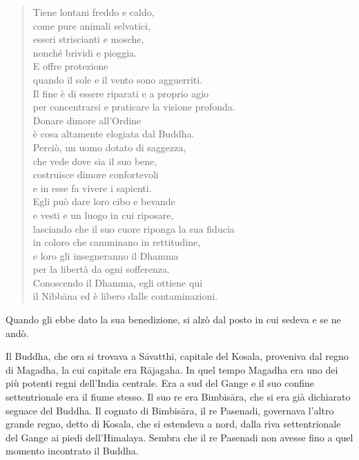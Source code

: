\begin{quote}
Tiene lontani freddo e caldo, \\
come pure animali selvatici, \\
esseri striscianti e mosche, \\
nonché brividi e pioggia. \\
E offre protezione \\
quando il sole e il vento sono agguerriti. \\
Il fine è di essere riparati e a proprio agio \\
per concentrarsi e praticare la visione profonda. \\
Donare dimore all’Ordine \\
è cosa altamente elogiata dal Buddha. \\
Perciò, un uomo dotato di saggezza, \\
che vede dove sia il suo bene, \\
costruisce dimore confortevoli \\
e in esse fa vivere i sapienti. \\
Egli può dare loro cibo e bevande \\
e vesti e un luogo in cui riposare, \\
lasciando che il suo cuore riponga la sua fiducia \\
in coloro che camminano in rettitudine, \\
e loro gli insegneranno il Dhamma \\
per la libertà da ogni sofferenza. \\
Conoscendo il Dhamma, egli ottiene qui \\
il Nibbāna ed è libero dalle contaminazioni.
\end{quote}

Quando gli ebbe dato la sua benedizione, si alzò dal posto in cui sedeva
e se ne andò.




 Il Buddha, che ora si trovava a Sāvatthī, capitale del
Kosala, proveniva dal regno di Magadha, la cui capitale era Rājagaha. In
quel tempo Magadha era uno dei più potenti regni dell’India centrale.
Era a sud del Gange e il suo confine settentrionale era il fiume stesso.
Il suo re era Bimbisāra, che si era già dichiarato seguace del Buddha.
Il cognato di Bimbisāra, il re Pasenadi, governava l’altro grande regno,
detto di Kosala, che si estendeva a nord, dalla riva settentrionale del
Gange ai piedi dell’Himalaya. Sembra che il re Pasenadi non avesse fino
a quel momento incontrato il Buddha.


